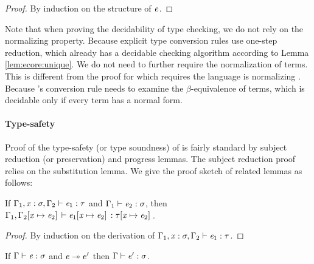 \begin{proof}
	By induction on the structure of $\mathit{e}$.
\end{proof}

Note that when proving the decidability of type checking, we do not rely on the
normalizing property. Because explicit type conversion rules use one-step
reduction, which already has a decidable checking algorithm according to Lemma
\ref{lem:ecore:unique}. We do not need to further require the normalization of
terms. This is different from the proof for \cc which requires the language is
normalizing \cite{pts:normalize}. Because \cc's conversion rule needs to
examine the $\beta$-equivalence of terms, which is decidable only if every term
has a normal form.

\paragraph{Type-safety}
Proof of the type-safety (or type soundness) of \ecore is fairly standard by subject
reduction (or preservation) and progress lemmas. The subject reduction proof
relies on the substitution lemma. We give the proof sketch of related lemmas as
follows:

\begin{lem}[Substitution]\label{lem:ecore:subst}
	If $\Gamma_{{\mathrm{1}}}  ,  \mathit{x}  :  \sigma  ,  \Gamma_{{\mathrm{2}}}  \vdash  \mathit{e_{{\mathrm{1}}}}  :  \tau$ and $\Gamma_{{\mathrm{1}}}  \vdash  \mathit{e_{{\mathrm{2}}}}  :  \sigma$, then $\Gamma_{{\mathrm{1}}}  ,  \Gamma_{{\mathrm{2}}}  [  \mathit{x}  \mapsto  \mathit{e_{{\mathrm{2}}}}  ] \,  \vdash  \mathit{e_{{\mathrm{1}}}}  [  \mathit{x}  \mapsto  \mathit{e_{{\mathrm{2}}}}  ] \,  :  \tau  [  \mathit{x}  \mapsto  \mathit{e_{{\mathrm{2}}}}  ] \,$.
\end{lem}

\begin{proof}
    By induction on the derivation of $\Gamma_{{\mathrm{1}}}  ,  \mathit{x}  :  \sigma  ,  \Gamma_{{\mathrm{2}}}  \vdash  \mathit{e_{{\mathrm{1}}}}  :  \tau$.
\end{proof}

\begin{thm}\label{lem:ecore:reduct}
If $\Gamma  \vdash  \mathit{e}  :  \sigma$ and $\mathit{e}  \twoheadrightarrow  e'$ then $\Gamma  \vdash  \mathit{e'}  :  \sigma$.
\end{thm}

